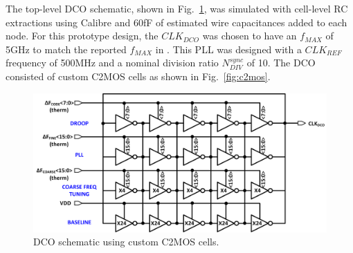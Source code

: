 \documentclass[twoside,9pt,journal,letterpage]{IEEEtran}
\begin{document}
The top-level DCO schematic, shown in Fig.\ \ref{fig:dco}, was simulated with cell-level RC extractions using Calibre and 60fF of estimated wire capacitances added to each node. For this prototype design, the $CLK_{DCO}$ was chosen to have an $f_{MAX}$ of 5GHz to match the reported $f_{MAX}$ in \cite{hashimoto2018}. This PLL was designed with a $CLK_{REF}$ frequency of 500MHz and a nominal division ratio $N_{DIV}^{sync}$ of 10. The DCO consisted of custom C2MOS cells as shown in Fig.\ \ref{fig:c2mos}. 

\begin{figure}[h]
	\centering
	\includegraphics[width=0.9\columnwidth]{fig_dco}
	\caption{DCO schematic using custom C2MOS cells.}
	\label{fig:dco}
\end{figure}
\end{document}
